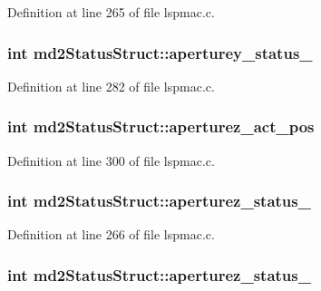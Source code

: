 Definition at line 265 of file lspmac.\-c.

\hypertarget{structmd2StatusStruct_a0a7738f13a0fa80626cafc2299b104b4}{
\subsubsection[{aperturey\-\_\-status\-\_\-2}]{\setlength{\rightskip}{0pt plus 5cm}int md2\-Status\-Struct\-::aperturey\-\_\-status\-\_}}\label{structmd2StatusStruct_a0a7738f13a0fa80626cafc2299b104b4}


Definition at line 282 of file lspmac.\-c.

\hypertarget{structmd2StatusStruct_a62d584ce23cfd9aa626d3c03649b455c}{
\subsubsection[{aperturez\-\_\-act\-\_\-pos}]{\setlength{\rightskip}{0pt plus 5cm}int md2\-Status\-Struct\-::aperturez\-\_\-act\-\_\-pos}}\label{structmd2StatusStruct_a62d584ce23cfd9aa626d3c03649b455c}


Definition at line 300 of file lspmac.\-c.

\hypertarget{structmd2StatusStruct_a27880dd795e1ba4fea4870c64ee3aa84}{
\subsubsection[{aperturez\-\_\-status\-\_\-1}]{\setlength{\rightskip}{0pt plus 5cm}int md2\-Status\-Struct\-::aperturez\-\_\-status\-\_}}\label{structmd2StatusStruct_a27880dd795e1ba4fea4870c64ee3aa84}


Definition at line 266 of file lspmac.\-c.

\hypertarget{structmd2StatusStruct_ae407a99e428d9f4a7444a02c8bc3414e}{
\subsubsection[{aperturez\-\_\-status\-\_\-2}]{\setlength{\rightskip}{0pt plus 5cm}int md2\-Status\-Struct\-::aperturez\-\_\-status\-\_}}\label{structmd2StatusStruct_ae407a99e428d9f4a7444a02c8bc3414e}


